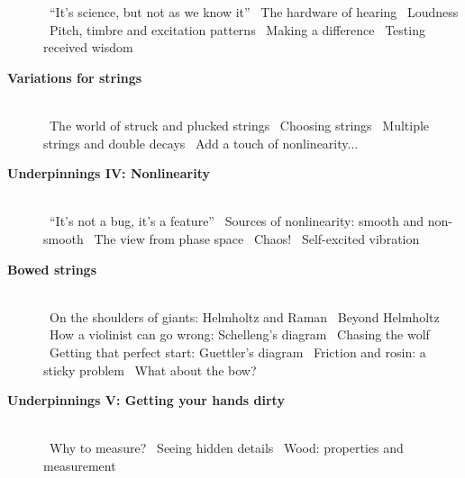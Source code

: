 \begin{description}
\quad{\gre{}\pageref{s:39a96d9b}}~``It's science, but not as we know it''
\quad{\gre{}\pageref{s:a7633d81}}~The hardware of hearing
\quad{\gre{}\pageref{s:6a3af4e9}}~Loudness
\quad{\gre{}\pageref{s:178c3027}}~Pitch, timbre and excitation patterns
\quad{\gre{}\pageref{s:8d325f1b}}~Making a difference
\quad{\gre{}\pageref{s:db51ecad}}~Testing received wisdom
\item[\hspace{-1cm}\pageref{s:44678680}\hspace{+0cm} \large\bf\sf \blu Variations for strings]\hfill \\ 
\quad{\gre{}\pageref{s:1362b486}}~The world of struck and plucked strings
\quad{\gre{}\pageref{s:6ca9cb3c}}~Choosing strings
\quad{\gre{}\pageref{s:e29cedb3}}~Multiple strings and double decays
\quad{\gre{}\pageref{s:d0f3f85f}}~Add a touch of nonlinearity...
\item[\hspace{-1cm}\pageref{s:13d5966b}\hspace{+0cm} \large\bf\sf \blu Underpinnings IV: Nonlinearity]\hfill \\ 
\quad{\gre{}\pageref{s:c76e1988}}~``It's not a bug, it's a feature''
\quad{\gre{}\pageref{s:0f985ca9}}~Sources of nonlinearity: smooth and non-smooth
\quad{\gre{}\pageref{s:5d4387ed}}~The view from phase space
\quad{\gre{}\pageref{s:73b8e2e1}}~Chaos!
\quad{\gre{}\pageref{s:53e7f1fb}}~Self-excited vibration
\item[\hspace{-1cm}\pageref{s:8d0a5547}\hspace{+0cm} \large\bf\sf \blu Bowed strings]\hfill \\ 
\quad{\gre{}\pageref{s:d4201552}}~On the shoulders of giants: Helmholtz and Raman
\quad{\gre{}\pageref{s:bd4845bd}}~Beyond Helmholtz
\quad{\gre{}\pageref{s:f6ce5a19}}~How a violinist can go wrong: Schelleng's diagram
\quad{\gre{}\pageref{s:66a141bf}}~Chasing the wolf
\quad{\gre{}\pageref{s:15546596}}~Getting that perfect start: Guettler's diagram
\quad{\gre{}\pageref{s:72515a88}}~Friction and rosin: a sticky problem
\quad{\gre{}\pageref{s:031bea39}}~What about the bow?
\item[\hspace{-1cm}\pageref{s:ad3c38a8}\hspace{+0cm} \large\bf\sf \blu Underpinnings V: Getting your hands dirty]\hfill \\ 
\quad{\gre{}\pageref{s:a001c3f3}}~Why to measure?
\quad{\gre{}\pageref{s:20b9da98}}~Seeing hidden details
\quad{\gre{}\pageref{s:1f6cd60b}}~Wood: properties and measurement

\end{description}
